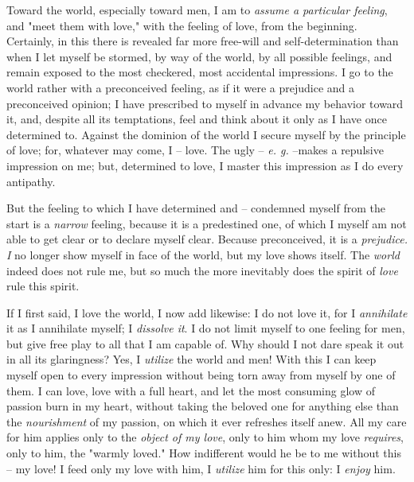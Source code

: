 \documentclass[a4paper]{book}
\begin{document}
Toward the world, especially toward men, I am to \textit{assume a particular 
feeling}, and "{}meet them with love,"{} with the feeling of love, from the 
beginning. Certainly, in this there is revealed far more free-will and 
self-determination than when I let myself be stormed, by way of the world, by 
all possible feelings, and remain exposed to the most checkered, most 
accidental impressions. I go to the world rather with a preconceived feeling, 
as if it were a prejudice and a preconceived opinion; I have prescribed to 
myself in advance my behavior toward it, and, despite all its temptations, 
feel and think about it only as I have once determined to. Against the 
dominion of the world I secure myself by the principle of love; for, whatever 
may come, I -- love. The ugly -- \textit{e. g.} --makes a repulsive impression 
on me; but, determined to love, I master this impression as I do every 
antipathy.

But the feeling to which I have determined and -- condemned myself from the 
start is a \textit{narrow} feeling, because it is a predestined one, of which 
I myself am not able to get clear or to declare myself clear. Because 
preconceived, it is a \textit{prejudice. I} no longer show myself in face of 
the world, but my love shows itself. The \textit{world} indeed does not rule 
me, but so much the more inevitably does the spirit of \textit{love} rule this 
spirit.

If I first said, I love the world, I now add likewise: I do not love it, for I 
\textit{annihilate} it as I annihilate myself; I \textit{dissolve it}. I do 
not limit myself to one feeling for men, but give free play to all that I am 
capable of. Why should I not dare speak it out in all its glaringness? Yes, I 
\textit{utilize} the world and men! With this I can keep myself open to every 
impression without being torn away from myself by one of them. I can love, 
love with a full heart, and let the most consuming glow of passion burn in my 
heart, without taking the beloved one for anything else than the 
\textit{nourishment} of my passion, on which it ever refreshes itself anew. 
All my care for him applies only to the \textit{object of my love}, only to 
him whom my love \textit{requires}, only to him, the "{}warmly loved."{} How 
indifferent would he be to me without this -- my love! I feed only my love 
with him, I \textit{utilize} him for this only: I \textit{enjoy} him.
\end{document}
